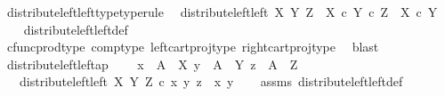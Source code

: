 \begin{isabellebody}
\isanewline
{}\isamarkupfalse%
\ distribute{\isacharunderscore}{\kern0pt}left{\isacharunderscore}{\kern0pt}left{\isacharunderscore}{\kern0pt}type{\isacharbrackleft}{\kern0pt}type{\isacharunderscore}{\kern0pt}rule{\isacharbrackright}{\kern0pt}{\isacharcolon}{\kern0pt}\isanewline
\ \ {\isachardoublequoteopen}distribute{\isacharunderscore}{\kern0pt}left{\isacharunderscore}{\kern0pt}left\ X\ Y\ Z\ {\isacharcolon}{\kern0pt}\ X\ {\isasymtimes}\isactrlsub c\ {\isacharparenleft}{\kern0pt}Y\ {\isasymtimes}\isactrlsub c\ Z{\isacharparenright}{\kern0pt}\ {\isasymrightarrow}\ X\ {\isasymtimes}\isactrlsub c\ Y{\isachardoublequoteclose}\isanewline
%
\isadelimproof
\ \ %
\endisadelimproof
%
\isatagproof
{}\isamarkupfalse%
\ distribute{\isacharunderscore}{\kern0pt}left{\isacharunderscore}{\kern0pt}left{\isacharunderscore}{\kern0pt}def\isanewline
\ \ \isamarkupfalse%
\ cfunc{\isacharunderscore}{\kern0pt}prod{\isacharunderscore}{\kern0pt}type\ comp{\isacharunderscore}{\kern0pt}type\ left{\isacharunderscore}{\kern0pt}cart{\isacharunderscore}{\kern0pt}proj{\isacharunderscore}{\kern0pt}type\ right{\isacharunderscore}{\kern0pt}cart{\isacharunderscore}{\kern0pt}proj{\isacharunderscore}{\kern0pt}type\ \isamarkupfalse%
\ blast%
\endisatagproof
{\isafoldproof}%
%
\isadelimproof
\isanewline
%
\endisadelimproof
\isanewline
{}\isamarkupfalse%
\ distribute{\isacharunderscore}{\kern0pt}left{\isacharunderscore}{\kern0pt}left{\isacharunderscore}{\kern0pt}ap{\isacharcolon}{\kern0pt}\ \isanewline
\ \ \ {\isachardoublequoteopen}x\ {\isacharcolon}{\kern0pt}\ A\ {\isasymrightarrow}\ X{\isachardoublequoteclose}\ {\isachardoublequoteopen}y\ {\isacharcolon}{\kern0pt}\ A\ {\isasymrightarrow}\ Y{\isachardoublequoteclose}\ {\isachardoublequoteopen}z\ {\isacharcolon}{\kern0pt}\ A\ {\isasymrightarrow}\ Z{\isachardoublequoteclose}\isanewline
\ \ \ {\isachardoublequoteopen}distribute{\isacharunderscore}{\kern0pt}left{\isacharunderscore}{\kern0pt}left\ X\ Y\ Z\ {\isasymcirc}\isactrlsub c\ {\isasymlangle}x{\isacharcomma}{\kern0pt}\ {\isasymlangle}y{\isacharcomma}{\kern0pt}\ z{\isasymrangle}{\isasymrangle}\ {\isacharequal}{\kern0pt}\ {\isasymlangle}x{\isacharcomma}{\kern0pt}\ y{\isasymrangle}{\isachardoublequoteclose}\isanewline
%
\isadelimproof
\ \ %
\endisadelimproof
%
\isatagproof
{}\isamarkupfalse%
\ assms\ distribute{\isacharunderscore}{\kern0pt}left{\isacharunderscore}{\kern0pt}left{\isacharunderscore}{\kern0pt}def\ \ \isanewline
\ \ \isamarkupfalse%

\end{isabellebody}
